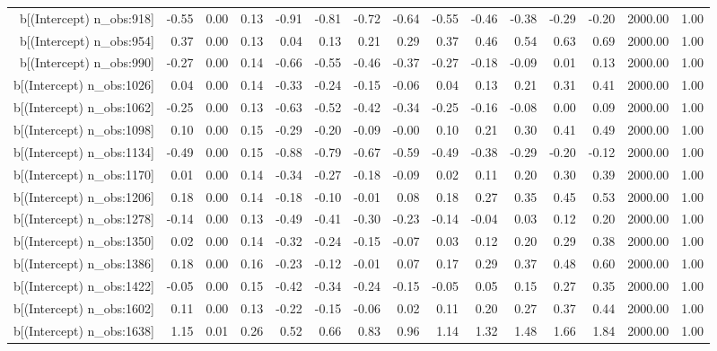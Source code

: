 \begin{table}[ht]
\begin{tabular}{rrrrrrrrrrrrrrr}
  b[(Intercept) n\_obs:918] & -0.55 & 0.00 & 0.13 & -0.91 & -0.81 & -0.72 & -0.64 & -0.55 & -0.46 & -0.38 & -0.29 & -0.20 & 2000.00 & 1.00 \\ 
  b[(Intercept) n\_obs:954] & 0.37 & 0.00 & 0.13 & 0.04 & 0.13 & 0.21 & 0.29 & 0.37 & 0.46 & 0.54 & 0.63 & 0.69 & 2000.00 & 1.00 \\ 
  b[(Intercept) n\_obs:990] & -0.27 & 0.00 & 0.14 & -0.66 & -0.55 & -0.46 & -0.37 & -0.27 & -0.18 & -0.09 & 0.01 & 0.13 & 2000.00 & 1.00 \\ 
  b[(Intercept) n\_obs:1026] & 0.04 & 0.00 & 0.14 & -0.33 & -0.24 & -0.15 & -0.06 & 0.04 & 0.13 & 0.21 & 0.31 & 0.41 & 2000.00 & 1.00 \\ 
  b[(Intercept) n\_obs:1062] & -0.25 & 0.00 & 0.13 & -0.63 & -0.52 & -0.42 & -0.34 & -0.25 & -0.16 & -0.08 & 0.00 & 0.09 & 2000.00 & 1.00 \\ 
  b[(Intercept) n\_obs:1098] & 0.10 & 0.00 & 0.15 & -0.29 & -0.20 & -0.09 & -0.00 & 0.10 & 0.21 & 0.30 & 0.41 & 0.49 & 2000.00 & 1.00 \\ 
  b[(Intercept) n\_obs:1134] & -0.49 & 0.00 & 0.15 & -0.88 & -0.79 & -0.67 & -0.59 & -0.49 & -0.38 & -0.29 & -0.20 & -0.12 & 2000.00 & 1.00 \\ 
  b[(Intercept) n\_obs:1170] & 0.01 & 0.00 & 0.14 & -0.34 & -0.27 & -0.18 & -0.09 & 0.02 & 0.11 & 0.20 & 0.30 & 0.39 & 2000.00 & 1.00 \\ 
  b[(Intercept) n\_obs:1206] & 0.18 & 0.00 & 0.14 & -0.18 & -0.10 & -0.01 & 0.08 & 0.18 & 0.27 & 0.35 & 0.45 & 0.53 & 2000.00 & 1.00 \\ 
  b[(Intercept) n\_obs:1278] & -0.14 & 0.00 & 0.13 & -0.49 & -0.41 & -0.30 & -0.23 & -0.14 & -0.04 & 0.03 & 0.12 & 0.20 & 2000.00 & 1.00 \\ 
  b[(Intercept) n\_obs:1350] & 0.02 & 0.00 & 0.14 & -0.32 & -0.24 & -0.15 & -0.07 & 0.03 & 0.12 & 0.20 & 0.29 & 0.38 & 2000.00 & 1.00 \\ 
  b[(Intercept) n\_obs:1386] & 0.18 & 0.00 & 0.16 & -0.23 & -0.12 & -0.01 & 0.07 & 0.17 & 0.29 & 0.37 & 0.48 & 0.60 & 2000.00 & 1.00 \\ 
  b[(Intercept) n\_obs:1422] & -0.05 & 0.00 & 0.15 & -0.42 & -0.34 & -0.24 & -0.15 & -0.05 & 0.05 & 0.15 & 0.27 & 0.35 & 2000.00 & 1.00 \\ 
  b[(Intercept) n\_obs:1602] & 0.11 & 0.00 & 0.13 & -0.22 & -0.15 & -0.06 & 0.02 & 0.11 & 0.20 & 0.27 & 0.37 & 0.44 & 2000.00 & 1.00 \\ 
  b[(Intercept) n\_obs:1638] & 1.15 & 0.01 & 0.26 & 0.52 & 0.66 & 0.83 & 0.96 & 1.14 & 1.32 & 1.48 & 1.66 & 1.84 & 2000.00 & 1.00 \\ 

\end{tabular}
\end{table}
